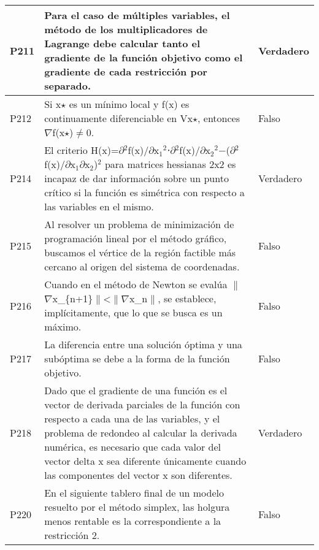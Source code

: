 \documentclass{article}
\begin{document}
\begin{longtable}{|p{1.5cm}|p{14cm}|p{2cm}|}
P211 & Para el caso de múltiples variables, el método de los multiplicadores de Lagrange debe calcular tanto el gradiente de la función objetivo como el gradiente de cada restricción por separado. & Verdadero \\ \hline
P212 & Si x$\star$ es un mínimo local y f(x) es continuamente diferenciable en Vx$\star$, entonces $\nabla$f(x$\star$)$\neq$0. & Falso \\ \hline
P214 & El criterio H(x)=$\partial$$^2$f(x)/$\partial$x$_1$$^2$⋅$\partial$$^2$f(x)/$\partial$x$_2$$^2$−($\partial$$^2$f(x)/$\partial$x$_1$$\partial$x$_2$)$^2$ para matrices hessianas 2x2 es incapaz de dar información sobre un punto crítico si la función es simétrica con respecto a las variables en el mismo. & Verdadero \\ \hline
P215 & Al resolver un problema de minimización de programación lineal por el método gráfico, buscamos el vértice de la región factible más cercano al origen del sistema de coordenadas. & Falso \\ \hline
P216 & Cuando en el método de Newton se evalúa $\|$$\nabla$x\_\{n+1\}$\|$<$\|$$\nabla$x\_n$\|$, se establece, implícitamente, que lo que se busca es un máximo. & Falso \\ \hline
P217 & La diferencia entre una solución óptima y una subóptima se debe a la forma de la función objetivo. & Falso \\ \hline
P218 & Dado que el gradiente de una función es el vector de derivada parciales de la función con respecto a cada una de las variables, y el problema de redondeo al calcular la derivada numérica, es necesario que cada valor del vector delta x sea diferente únicamente cuando las componentes del vector x son diferentes. & Verdadero \\ \hline
P220 & En el siguiente tablero final de un modelo resuelto por el método simplex, las holgura menos rentable es la correspondiente a la restricción 2. & Falso \\ \hline
\end{longtable}
\end{document}
